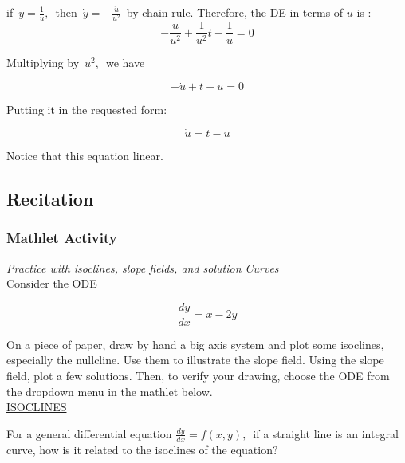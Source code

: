 if $\, y = \frac{1}{u},\,$ then $\, \dot y = - \frac{\dot u}{u^2}\, $
by chain rule.
Therefore, the DE in terms of $u$ is :
\begin{equation*}
  -\frac{\dot u}{u^2} + \frac{1}{u^2} t - \frac{1}{u} = 0
\end{equation*}

Multiplying by $\, u^2, \,$ we have

\begin{equation*}
  - \dot u + t - u = 0
\end{equation*}

Putting it in the requested form:

\begin{equation*}
  \dot u = t - u 
\end{equation*}

Notice that this equation linear.

\clearpage

\subsection{Recitation }

\subsubsection{Mathlet Activity}

\emph{\color{blue} Practice with isoclines, slope fields, and solution Curves} \\

Consider the ODE

\begin{equation*}
  \displaystyle \frac{dy}{dx} = x-2y
\end{equation*}

On a piece of paper, draw by hand a big axis system and plot some isoclines, especially the nullcline.
Use them to illustrate the slope field.
Using the slope field, plot a few solutions.
Then, to verify your drawing, choose the ODE from the dropdown menu in the mathlet below.\\

\href{http://mathlets.org/mathlets/isoclines/}
{ISOCLINES}

\begin{question}
  For a general differential equation $\displaystyle \frac{dy}{dx} = f(x, y),\,$
  if a straight line is an integral curve, how is it related to the isoclines of the equation?
\end{question}

